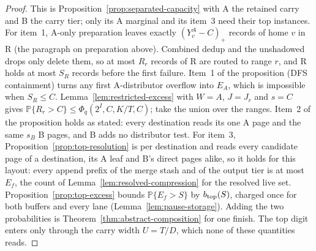 \documentclass[11pt]{article}
\theoremstyle{definition}
\theoremstyle{remark}
\newcommand{\Prb}{\mathbb P}
\begin{document}
\begin{proof}
This is Proposition~\ref{prop:separated-capacity} with A the retained
carry and B the carry tier; only its A marginal and its item~3 need their
top instances.
For item~1, A-only preparation leaves exactly $(Y^A_v-C)_+$ records of
home $v$ in R (the paragraph on preparation above). Combined dedup and the
unshadowed drops only delete them, so at most $R_r$ records of R are routed
to range $r$, and R holds at most $S_R$ records before the first failure.
Item~1 of the proposition (DFS containment) turns any first
A-distributor overflow into $E_A$, which is impossible when $S_R\le C$.
Lemma~\ref{lem:restricted-excess} with $W=A$, $J=J_r$ and $s=C$ gives
$\Prb\{R_r>C\}\le\Phi_q(2^I,C,K/T,C)$; take the union over the ranges.
Item~2 of the proposition holds as stated: every destination reads its one
A page and the same $s_B$ B pages, and B adds no distributor test.
For item~3, Proposition~\ref{prop:top-resolution} is per destination and
reads every candidate page of a destination, its A leaf and B's direct
pages alike, so it holds for this layout: every append prefix of the merge
stash and of the output tier is at most $E_f$, the count of
Lemma~\ref{lem:resolved-compression} for the resolved live set.
Proposition~\ref{prop:top-excess} bounds $\Prb\{E_f>S\}$ by
$b_{\rm top}(S)$, charged once for both buffers and every lane
(Lemma~\ref{lem:pause-storage}). Adding the two probabilities is
Theorem~\ref{thm:abstract-composition} for one finish. The top digit
enters only through the carry width $U=T/D$, which none of these
quantities reads.
\end{proof}
\end{document}
